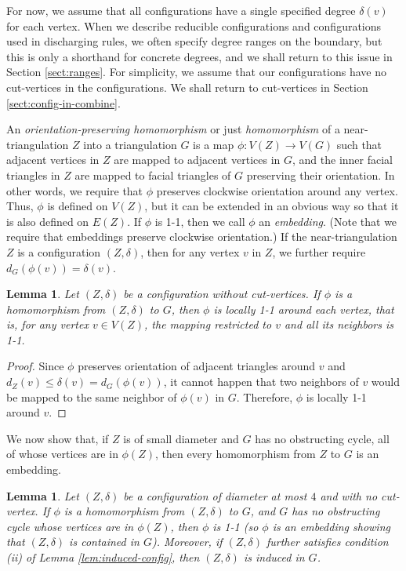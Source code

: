\documentclass[10pt,a4paper]{article}
\newtheorem{lem}[thm]{Lemma}
\def\showlabel#1{}
\begin{document}
For now, we assume that all configurations have a single specified degree $\delta(v)$ for each vertex. When we describe reducible configurations and configurations used in discharging rules, we often specify degree ranges on the boundary, but this is only a shorthand for concrete degrees, and we shall return to this issue in Section \ref{sect:ranges}. For simplicity, we assume that our configurations have no cut-vertices in the configurations. We shall return to cut-vertices in Section \ref{sect:config-in-combine}.

An \emph{orientation-preserving homomorphism} or just
\emph{homomorphism} of a near-triangulation $Z$ into a triangulation $G$ is a map $\phi: V(Z) \to V(G)$ such that 
adjacent vertices in $Z$ are mapped to adjacent vertices in $G$, 
and the inner facial triangles in $Z$ are mapped to facial triangles of $G$ preserving their orientation. In other words, we require that $\phi$ preserves clockwise orientation around any vertex.
Thus, $\phi$ is defined on $V(Z)$, but it can be extended in an obvious way so that it is also defined on $E(Z)$.
If $\phi$ is 1-1, then we call $\phi$ an \emph{embedding}. (Note that we require that embeddings preserve clockwise orientation.) If the near-triangulation $Z$ is a configuration $(Z,\delta)$, then for any vertex $v$ in $Z$, we further require $d_G(\phi(v))=\delta(v)$. 

\begin{lem}\label{lem:locally 1-1}
Let $(Z,\delta)$ be a configuration without cut-vertices. If 
$\phi$ is a homomorphism from $(Z,\delta)$ to $G$, then $\phi$ is locally 1-1 around each vertex, that is, for any vertex $v\in V(Z)$, the mapping restricted to $v$ and all its neighbors is 1-1. 
\end{lem}

\begin{proof}
Since $\phi$ preserves orientation of adjacent triangles around $v$ and $d_Z(v)\le \delta(v)=d_G(\phi(v))$, it cannot happen that two neighbors of $v$ would be mapped to the same neighbor of $\phi(v)$ in $G$. Therefore, $\phi$ is locally 1-1 around $v$.
\end{proof}

We now show that, if $Z$ is of small diameter and $G$ has no obstructing cycle, all of whose vertices are in $\phi(Z)$, then every homomorphism from $Z$ to $G$ is an embedding.


\begin{lem}\label{lem:1-1} \showlabel{lem:1-1}
Let $(Z,\delta)$ be a configuration 
of diameter at most $4$ and with no cut-vertex. If 
$\phi$ is a homomorphism from $(Z,\delta)$ to $G$, and $G$ has no obstructing cycle 
whose vertices are in $\phi(Z)$, then $\phi$ is 1-1 
(so $\phi$ is an embedding showing that $(Z,\delta)$ is contained in $G$).
Moreover, if $(Z,\delta)$ further satisfies condition (ii) of Lemma \ref{lem:induced-config}, then $(Z,\delta)$ is induced in $G$.
\end{lem}
\end{document}
